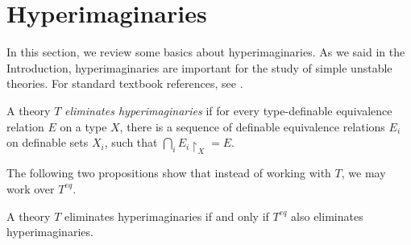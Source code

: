 
\bigskip

\section{Hyperimaginaries}\label{hyperimaginaries}
In this section, we review some basics about hyperimaginaries. As we said in the Introduction, hyperimaginaries are important for the study of simple unstable theories. For standard textbook references, see \cites[\S3\addsemicolon]{alma992983361725701631}[\S\S15, 18]{casanovas2011simple}. 

\begin{defin}
    A theory $T$ \textit{eliminates hyperimaginaries} if for every type-definable equivalence relation $E$ on a type $X$, there is a sequence of definable equivalence relations $E_i$ on definable sets $X_i$, such that $\bigcap_i E_i \upharpoonright_X = E$.
\end{defin}

The following two propositions show that instead of working with $T$, we may work over $T^{eq}$.

\begin{prop}\label{EHI invariant under eq}
    A theory $T$ eliminates hyperimaginaries if and only if $T^{eq}$ also eliminates hyperimaginaries.
\end{prop}

